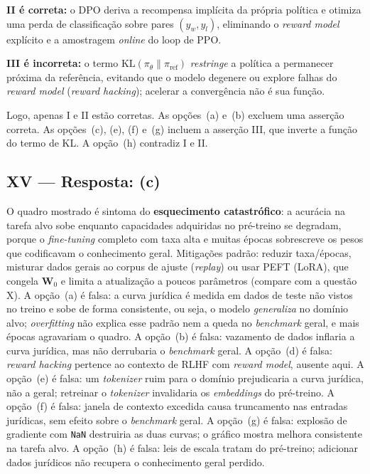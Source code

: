 \documentclass{dlproblemset}
\begin{document}
\textbf{II é correta:} o DPO deriva a recompensa implícita da própria política e otimiza
uma perda de classificação sobre pares $(y_w, y_l)$, eliminando o \textit{reward model}
explícito e a amostragem \textit{online} do loop de PPO.

\textbf{III é incorreta:} o termo $\mathrm{KL}(\pi_\theta \| \pi_{\text{ref}})$
\emph{restringe} a política a permanecer próxima da referência, evitando que o modelo
degenere ou explore falhas do \textit{reward model} (\textit{reward hacking});
acelerar a convergência não é sua função.

Logo, apenas I e II estão corretas.
As opções~(a) e~(b) excluem uma asserção correta.
As opções~(c), (e), (f) e~(g) incluem a asserção III, que inverte a função do termo de KL.
A opção~(h) contradiz I e II.

\subsection*{XV — Resposta: (c)}
O quadro mostrado é sintoma do \textbf{esquecimento catastrófico}: a acurácia na tarefa
alvo sobe enquanto capacidades adquiridas no pré-treino se degradam, porque o
\textit{fine-tuning} completo com taxa alta e muitas épocas sobrescreve os pesos que
codificavam o conhecimento geral. Mitigações padrão: reduzir taxa/épocas, misturar
dados gerais ao corpus de ajuste (\textit{replay}) ou usar PEFT (LoRA), que congela
$\mathbf{W}_0$ e limita a atualização a poucos parâmetros (compare com a questão X).
A opção~(a) é falsa: a curva jurídica é medida em dados de teste não vistos no treino e
sobe de forma consistente, ou seja, o modelo \emph{generaliza} no domínio alvo;
\textit{overfitting} não explica esse padrão nem a queda no \textit{benchmark} geral, e
mais épocas agravariam o quadro.
A opção~(b) é falsa: vazamento de dados inflaria a curva jurídica, mas não derrubaria o
\textit{benchmark} geral.
A opção~(d) é falsa: \textit{reward hacking} pertence ao contexto de RLHF com
\textit{reward model}, ausente aqui.
A opção~(e) é falsa: um \textit{tokenizer} ruim para o domínio prejudicaria a curva
jurídica, não a geral; retreinar o \textit{tokenizer} invalidaria os \textit{embeddings}
do pré-treino.
A opção~(f) é falsa: janela de contexto excedida causa truncamento nas entradas
jurídicas, sem efeito sobre o \textit{benchmark} geral.
A opção~(g) é falsa: explosão de gradiente com \texttt{NaN} destruiria as duas curvas; o
gráfico mostra melhora consistente na tarefa alvo.
A opção~(h) é falsa: leis de escala tratam do pré-treino; adicionar dados jurídicos não
recupera o conhecimento geral perdido.
\end{document}
